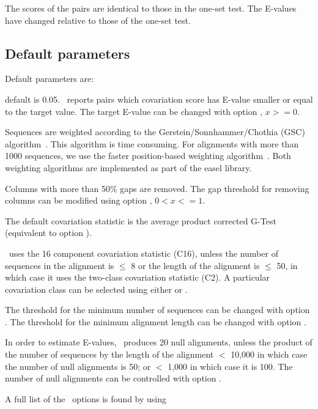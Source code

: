 The scores of the pairs are identical to those in the one-set
test. The E-values have changed relative to those of the one-set test.


 \subsection{Default parameters}

Default parameters are:

\begin{sreitems}{}
\item[\emprog{Target E-value:}]default is 0.05. \rscape\, reports
  pairs which covariation score has E-value smaller or equal to the
  target value.  The target E-value can be changed with option
  , $x >= 0$.

\item[\emprog{Sequence weighting:}]Sequences are weighted according to
  the Gerstein/Sonnhammer/Chothia (GSC)
  algorithm~\citep{Gerstein94}. This algorithm is time consuming. For
  alignments with more than 1000 sequences, we use the faster
  position-based weighting algorithm~\citep{Henikoff94b}. Both
  weighting algorithms are implemented as part of the easel library.

\item[\emprog{Gaps in columns:}]Columns with more than 50\% gaps are
  removed. The gap threshold for removing columns can be modified
   using option  , $0<x<=1$.

 \item[\emprog{Covariation statistic:}]The default covariation statistic
   is the average product corrected G-Test (equivalent to option
   ).

 \item[\emprog{Covariation Class:}]\rscape\ uses the 16 component
   covariation statistic (C16), unless the number of sequences in the
   alignment is $\leq$ 8 or the length of the alignment is $\leq$ 50,
   in which case it uses the two-class covariation statistic (C2). A
   particular covariation class can be selected using either
    or .

   The threshold for the minimum number of sequences can be changed
   with option .  The threshold for the minimum
   alignment length can be changed with option .

 \item[\emprog{Null alignments:}]In order to estimate E-values,
   \rscape\ produces 20 null alignments, unless the product of the
   number of sequences by the length of the alignment $<$ 10,000 in
   which case the number of null alignments is 50; or $<$ 1,000 in
   which case it is 100. The number of null alignments can be
   controlled with option .
 \end{sreitems}

 A full list of the \rscape\ options is found by using


 
 
